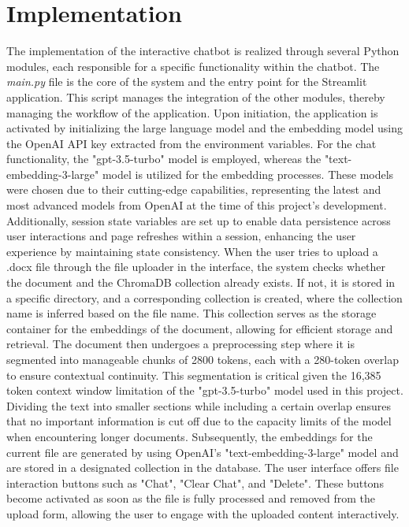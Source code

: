 \documentclass{article}
\begin{document}
\section{Implementation}
The implementation of the interactive chatbot is realized through several Python modules, each responsible for a specific functionality within the chatbot. The \textit{main.py} file is the core of the system and the entry point for the Streamlit application. This script manages the integration of the other modules, thereby managing the workflow of the application.
\newline
Upon initiation, the application is activated by initializing the large language model and the embedding model using the OpenAI API key extracted from the environment variables. For the chat functionality, the "gpt-3.5-turbo" model is employed, whereas the "text-embedding-3-large" model is utilized for the embedding processes. These models were chosen due to their cutting-edge capabilities, representing the latest and most advanced models from OpenAI at the time of this project's development. Additionally, session state variables are set up to enable data persistence across user interactions and page refreshes within a session, enhancing the user experience by maintaining state consistency.
\newline
When the user tries to upload a .docx file through the file uploader in the interface, the system checks whether the document and the ChromaDB collection already exists. If not, it is stored in a specific directory, and a corresponding collection is created, where the collection name is inferred based on the file name. This collection serves as the storage container for the embeddings of the document, allowing for efficient storage and retrieval.
\newline
The document then undergoes a preprocessing step where it is segmented into manageable chunks of 2800 tokens, each with a 280-token overlap to ensure contextual continuity. This segmentation is critical given the 16,385 token context window limitation of the "gpt-3.5-turbo" model used in this project. Dividing the text into smaller sections while including a certain overlap ensures that no important information is cut off due to the capacity limits of the model when encountering longer documents. Subsequently, the embeddings for the current file are generated by using OpenAI's "text-embedding-3-large" model and are stored in a designated collection in the database.
\newline
The user interface offers file interaction buttons such as "Chat", "Clear Chat", and "Delete". These buttons become activated as soon as the file is fully processed and removed from the upload form, allowing the user to engage with the uploaded content interactively. 
\end{document}
